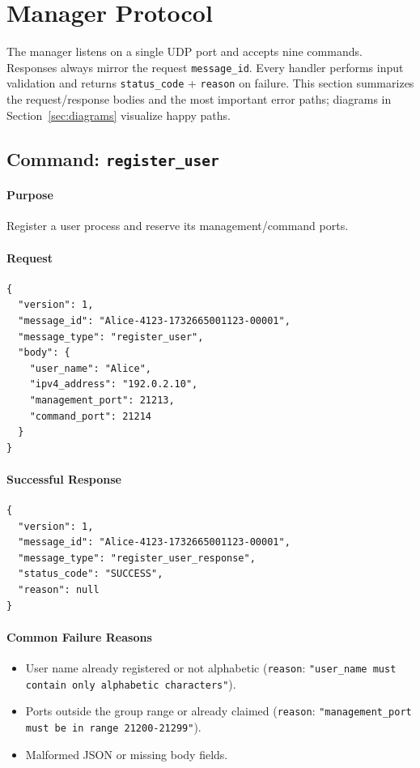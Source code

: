 \documentclass[11pt]{article}
\begin{document}
\section{Manager Protocol}
The manager listens on a single UDP port and accepts nine commands. Responses always mirror the request \texttt{message\_id}. Every handler performs input validation and returns \texttt{status\_code} + \texttt{reason} on failure. This section summarizes the request/response bodies and the most important error paths; diagrams in Section~\ref{sec:diagrams} visualize happy paths.

\subsection{Command: \texttt{register\_user}}
\paragraph{Purpose} Register a user process and reserve its management/command ports.

\paragraph{Request}
\begin{verbatim}
{
  "version": 1,
  "message_id": "Alice-4123-1732665001123-00001",
  "message_type": "register_user",
  "body": {
    "user_name": "Alice",
    "ipv4_address": "192.0.2.10",
    "management_port": 21213,
    "command_port": 21214
  }
}
\end{verbatim}

\paragraph{Successful Response}
\begin{verbatim}
{
  "version": 1,
  "message_id": "Alice-4123-1732665001123-00001",
  "message_type": "register_user_response",
  "status_code": "SUCCESS",
  "reason": null
}
\end{verbatim}

\paragraph{Common Failure Reasons}
\begin{itemize}
  \item User name already registered or not alphabetic (\texttt{reason}: \texttt{"user\_name must contain only alphabetic characters"}).
  \item Ports outside the group range or already claimed (\texttt{reason}: \texttt{"management\_port must be in range 21200-21299"}).
  \item Malformed JSON or missing body fields.
\end{itemize}
\end{document}
